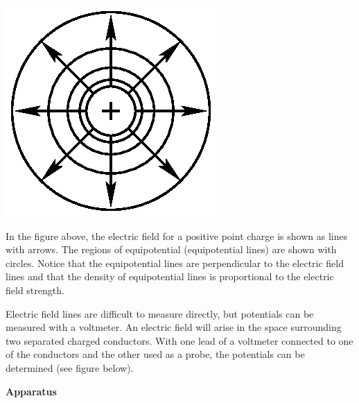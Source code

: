 \vspace{0.3cm}
{\centering \includegraphics{ef_equipot_lines_fig_2.eps} \par}
\vspace{0.3cm}

In the figure above, the electric field for a positive point charge
is shown as lines with arrows. The regions of equipotential (equipotential
lines) are shown with circles. Notice that the equipotential lines
are perpendicular to the electric field lines and that the density
of equipotential lines is proportional to the electric field strength.

Electric field lines are difficult to measure directly, but potentials
can be measured with a voltmeter. An electric field will arise in
the space surrounding two separated charged conductors. With one lead
of a voltmeter connected to one of the conductors and the other used
as a probe, the potentials can be determined (see figure below).

\vspace{0.3cm}
{\centering {} \par}
\vspace{0.3cm}

\textbf{Apparatus}

